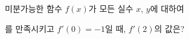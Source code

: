 미분가능한 함수 $f(x)$가 모든 실수 $x$, $y$에 대하여 \par\smallskip{}\par\smallskip\noindent 를 만족시키고 $f'(0)=-1$일 때, $f'(2)$의 값은?
